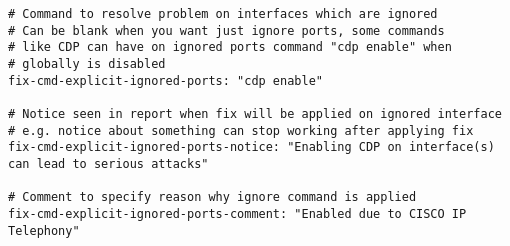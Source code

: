 \begin{lstlisting}
# Command to resolve problem on interfaces which are ignored
# Can be blank when you want just ignore ports, some commands
# like CDP can have on ignored ports command "cdp enable" when
# globally is disabled
fix-cmd-explicit-ignored-ports: "cdp enable"

# Notice seen in report when fix will be applied on ignored interface
# e.g. notice about something can stop working after applying fix
fix-cmd-explicit-ignored-ports-notice: "Enabling CDP on interface(s) can lead to serious attacks"

# Comment to specify reason why ignore command is applied
fix-cmd-explicit-ignored-ports-comment: "Enabled due to CISCO IP Telephony"

\end{lstlisting}



